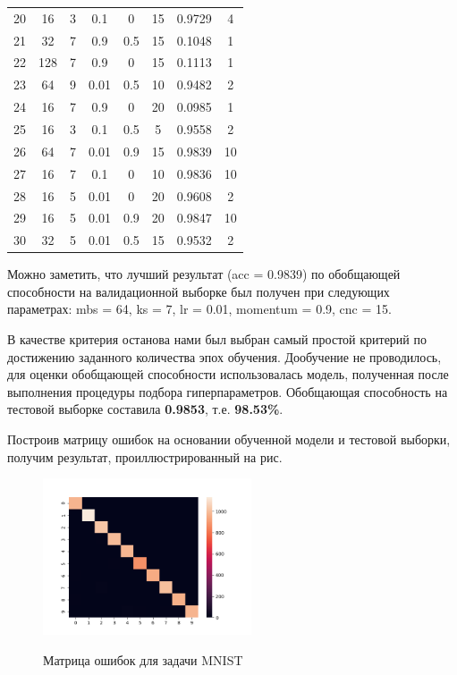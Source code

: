 \begin{textitemize}
\begin{table}[ht]
\begin{tabular}{c c c c c c c c}
		20       & 16  & 3  & 0.1   & 0        & 15  & 0.9729 & 4  \\
		21       & 32  & 7  & 0.9   & 0.5      & 15  & 0.1048 & 1  \\
		22       & 128 & 7  & 0.9   & 0        & 15  & 0.1113 & 1  \\
		23       & 64  & 9  & 0.01  & 0.5      & 10  & 0.9482 & 2  \\
		24       & 16  & 7  & 0.9   & 0        & 20  & 0.0985 & 1  \\
		25       & 16  & 3  & 0.1   & 0.5      & 5   & 0.9558 & 2  \\
		26       & 64  & 7  & 0.01  & 0.9      & 15  & 0.9839 & 10 \\
		27       & 16  & 7  & 0.1   & 0        & 10  & 0.9836 & 10 \\
		28       & 16  & 5  & 0.01  & 0        & 20  & 0.9608 & 2  \\
		29       & 16  & 5  & 0.01  & 0.9      & 20  & 0.9847 & 10 \\
		30       & 32  & 5  & 0.01  & 0.5      & 15  & 0.9532 & 2  \\
		\hline
	\end{tabular}
	\label{table:nonlin}
\end{table}

Можно заметить, что лучший результат (acc = 0.9839) по обобщающей способности на валидационной выборке был получен при следующих параметрах: mbs = 64, ks = 7, lr = 0.01, momentum = 0.9, cnc = 15.

\item В качестве критерия останова нами был выбран самый простой критерий по достижению заданного количества эпох обучения. Дообучение не проводилось, для оценки обобщающей способности использовалась модель, полученная после выполнения процедуры подбора гиперпараметров. Обобщающая способность на тестовой выборке составила \textbf{0.9853}, т.е. \textbf{98.53\%}.

\item Построив матрицу ошибок на основании обученной модели и тестовой выборки, получим результат, проиллюстрированный на рис. 

\begin{figure}[h]
	\centering
	\caption{Матрица ошибок для задачи MNIST}
	\includegraphics[width=0.55\textwidth]{author/part3/figures/conf_matrix_result.png}
	\label{fig:conf_matrix_result}
\end{figure}


\end{textitemize}
